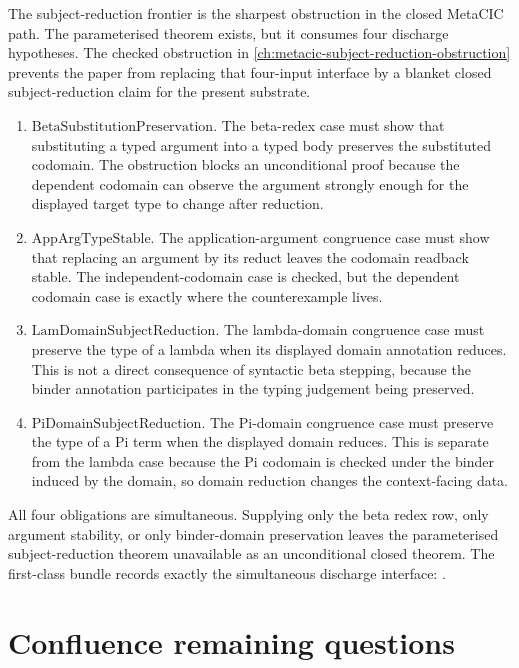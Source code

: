 The subject-reduction frontier is the sharpest obstruction in the closed
MetaCIC path. The parameterised theorem exists, but it consumes four discharge
hypotheses. The checked obstruction in
\autoref{ch:metacic-subject-reduction-obstruction} prevents the paper from
replacing that four-input interface by a blanket closed subject-reduction
claim for the present substrate.

\begin{enumerate}
\item $\mathrm{BetaSubstitutionPreservation}$. The beta-redex case must show
  that substituting a typed argument into a typed body preserves the substituted
  codomain. The obstruction blocks an unconditional proof because the dependent
  codomain can observe the argument strongly enough for the displayed target
  type to change after reduction.
\item $\mathrm{AppArgTypeStable}$. The application-argument congruence case
  must show that replacing an argument by its reduct leaves the codomain
  readback stable. The independent-codomain case is checked, but the dependent
  codomain case is exactly where the counterexample lives.
\item $\mathrm{LamDomainSubjectReduction}$. The lambda-domain congruence case
  must preserve the type of a lambda when its displayed domain annotation
  reduces. This is not a direct consequence of syntactic beta stepping, because
  the binder annotation participates in the typing judgement being preserved.
\item $\mathrm{PiDomainSubjectReduction}$. The Pi-domain congruence case must
  preserve the type of a Pi term when the displayed domain reduces. This is
  separate from the lambda case because the Pi codomain is checked under the
  binder induced by the domain, so domain reduction changes the context-facing
  data.
\end{enumerate}

All four obligations are simultaneous. Supplying only the beta redex row, only
argument stability, or only binder-domain preservation leaves the parameterised
subject-reduction theorem unavailable as an unconditional closed theorem. The
first-class bundle records exactly the simultaneous discharge interface:
.

\section{Confluence remaining questions}
\label{sec:metacic-open-problems-confluence}

